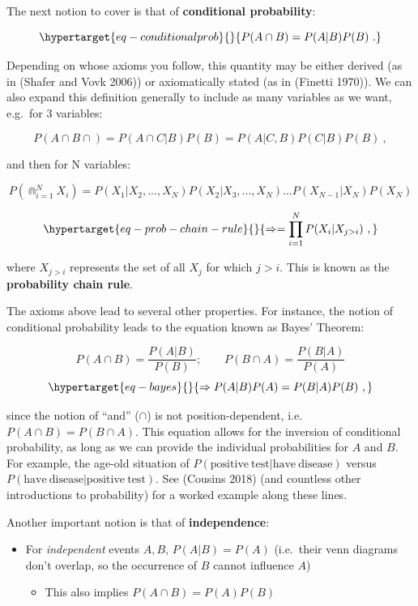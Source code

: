 \documentclass[
  11pt,
  numbers=noendperiod]{book}
\providecommand{\tightlist}{%
  \setlength{\itemsep}{0pt}\setlength{\parskip}{0pt}}\usepackage{longtable,booktabs,array}
\begin{document}
The next notion to cover is that of \textbf{conditional probability}:

\begin{equation}\protect\hypertarget{eq-conditionalprob}{}{
P(A \cap B) = P(A | B)P(B)~.
}\label{eq-conditionalprob}\end{equation}

Depending on whose axioms you follow, this quantity may be either
derived (as in (Shafer and Vovk 2006)) or axiomatically stated (as in
(Finetti 1970)). We can also expand this definition generally to include
as many variables as we want, e.g.~for 3 variables:

\[
P(A \cap B \cap) = P(A \cap C | B)P(B) = P(A| C,B)P(C|B)P(B)~,
\]

and then for N variables:

\[
P(\Cap_{i=1}^N X_i) = P(X_1 | X_2, ..., X_N)P(X_2 | X_3, ..., X_N)\dots P(X_{N-1} | X_N)P(X_N)
\]

\begin{equation}\protect\hypertarget{eq-prob-chain-rule}{}{
\Rightarrow = \prod_{i=1}^N P(X_i | X_{j > i})~,
}\label{eq-prob-chain-rule}\end{equation}

where \(X_{j > i}\) represents the set of all \(X_j\) for which
\(j >i\). This is known as the \textbf{probability chain rule}.

The axioms above lead to several other properties. For instance, the
notion of conditional probability leads to the equation known as Bayes'
Theorem:

\[
P(A\cap B) = \frac{P(A|B)}{P(B)};\qquad P(B\cap A) = \frac{P(B|A)}{P(A)}
\] \begin{equation}\protect\hypertarget{eq-bayes}{}{
\Rightarrow P(A|B)P(A) = P(B|A)P(B)~,
}\label{eq-bayes}\end{equation}

since the notion of ``and'' (\(\cap\)) is not position-dependent,
i.e.~\(P(A\cap B) = P(B\cap A)\). This equation allows for the inversion
of conditional probability, as long as we can provide the individual
probabilities for \(A\) and \(B\). For example, the age-old situation of
\(P(\mathrm{positive~test} | \mathrm{have~disease})\) versus
\(P(\mathrm{have~disease} | \mathrm{positive~test})\). See (Cousins
2018) (and countless other introductions to probability) for a worked
example along these lines.

Another important notion is that of \textbf{independence}:

\begin{itemize}
\tightlist
\item
  For \emph{independent} events \(A,B\), \(P(A | B) = P(A)\) (i.e.~their
  venn diagrams don't overlap, so the occurrence of \(B\) cannot
  influence \(A\))

  \begin{itemize}
  \tightlist
  \item
    This also implies \(P(A\cap B) = P(A)P(B)\)
  \end{itemize}
\end{itemize}
\end{document}
